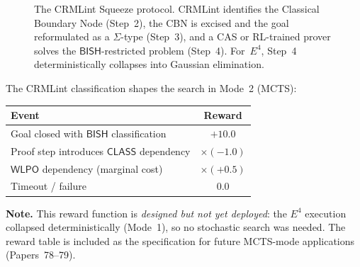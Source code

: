 \documentclass[11pt]{article}
\theoremstyle{plain}
\theoremstyle{definition}
\theoremstyle{remark}
\newcommand{\BISH}{\mathsf{BISH}}
\newcommand{\WLPO}{\mathsf{WLPO}}
\newcommand{\CLASS}{\mathsf{CLASS}}
\begin{document}
\begin{figure}[ht]
\centering
{}
\caption{The CRMLint Squeeze protocol.  CRMLint identifies the
Classical Boundary Node (Step~2), the CBN is excised and the goal
reformulated as a $\Sigma$-type (Step~3), and a CAS or RL-trained
prover solves the $\BISH$-restricted problem (Step~4).  For~$E^4$,
Step~4 deterministically collapses into Gaussian elimination.}
\label{fig:squeeze}
\end{figure}

\noindent
The CRMLint classification shapes the search in Mode~2 (MCTS):

\begin{center}
\begin{tabular}{lc}
\toprule
\textbf{Event} & \textbf{Reward} \\
\midrule
Goal closed with $\BISH$ classification & $+10.0$ \\
Proof step introduces $\CLASS$ dependency & $\times(-1.0)$ \\
$\WLPO$ dependency (marginal cost) & $\times(+0.5)$ \\
Timeout / failure & $0.0$ \\
\bottomrule
\end{tabular}
\end{center}

\noindent
\textbf{Note.}  This reward function is \emph{designed but not yet
deployed}: the $E^4$ execution collapsed deterministically
(Mode~1), so no stochastic search was needed.  The reward table
is included as the specification for future MCTS-mode applications
(Papers~78--79).
\end{document}
